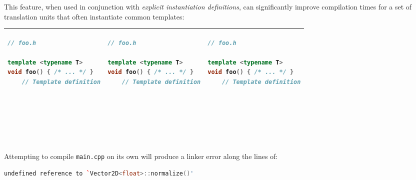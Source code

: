 \documentclass[twoside,10pt,letterpaper,usenames]{newstyle-PearsonGeneric-7-38}
\newcommand{\passthrough}[1]{\lstset{mathescape=false}#1\lstset{mathescape=true}}
\begin{document}
This feature, when used in conjunction with \emph{explicit instantiation
definitions}, can significantly improve compilation times for a set of
translation units that often instantiate common templates:

\begin{longtable}[]{@{}lll@{}}
\toprule
\endhead
\begin{minipage}[t]{0.30\columnwidth}\raggedright
\begin{lstlisting}[language=C++, caption={ missing caption }, label={ testlabel }, frame=tb]
// foo.h

template <typename T>
void foo() { /* ... */ }
    // Template definition







\end{lstlisting}
    \strut
\end{minipage} & \begin{minipage}[t]{0.30\columnwidth}\raggedright
\begin{lstlisting}[language=C++, caption={ missing caption }, label={ testlabel }, frame=tb]
// foo.h

template <typename T>
void foo() { /* ... */ }
    // Template definition







\end{lstlisting}
    \strut
\end{minipage} & \begin{minipage}[t]{0.30\columnwidth}\raggedright
\begin{lstlisting}[language=C++, caption={ missing caption }, label={ testlabel }, frame=tb]
// foo.h

template <typename T>
void foo() { /* ... */ }
    // Template definition







\end{lstlisting}
    \strut
\end{minipage}\tabularnewline
\bottomrule
\end{longtable}

Attempting to compile \passthrough{\lstinline!main.cpp!} on its own will
produce a linker error along the lines of:

\begin{lstlisting}[language=C++, caption={ missing caption }, label={ testlabel }, frame=tb]
undefined reference to `Vector2D<float>::normalize()'
\end{lstlisting}
    
\end{document}
